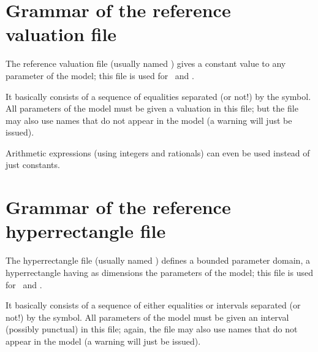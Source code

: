 


\section{Grammar of the reference valuation file}

The reference valuation file (usually named ) gives a constant value to any parameter of the model;
this file is used for~\IM{} and \PRP{}.

It basically consists of a sequence of equalities  separated (or not!) by the \styleIMI{\&} symbol.
All parameters of the model must be given a valuation in this file; but the file may also use names that do not appear in the model (a warning will just be issued).

Arithmetic expressions (using integers and rationals) can even be used instead of just constants.



\section{Grammar of the reference hyperrectangle file}

The hyperrectangle file (usually named ) defines a bounded parameter domain, \ie{} a hyperrectangle having as dimensions the parameters of the model;
this file is used for~\BC{} and \PRPC{}.

It basically consists of a sequence of either equalities  or intervals  separated (or not!) by the \styleIMI{\&} symbol.
All parameters of the model must be given an interval (possibly punctual) in this file; again, the file may also use names that do not appear in the model (a warning will just be issued).

